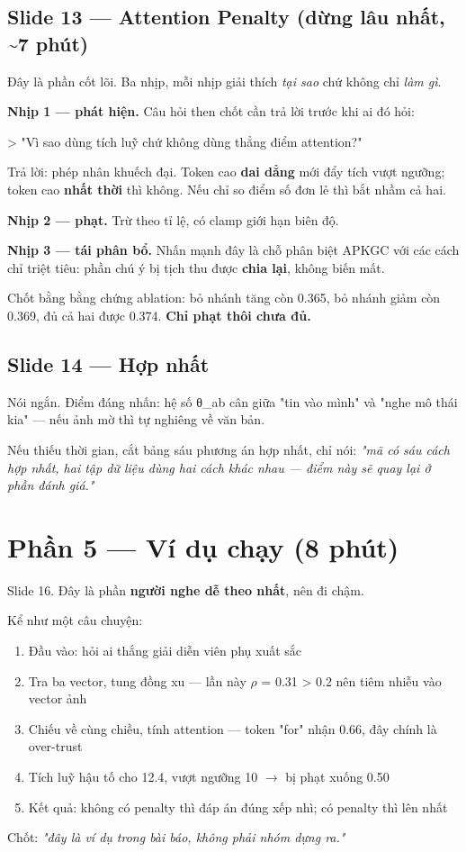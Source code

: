 \documentclass[11pt,a4paper]{article}
\newcommand{\code}[1]{{\ttfamily\small\color{codetext}#1}}
\begin{document}
\subsection{Slide 13 --- Attention Penalty (dừng lâu nhất, \textasciitilde{}7 phút)}
Đây là phần cốt lõi. Ba nhịp, mỗi nhịp giải thích \emph{tại sao} chứ không chỉ \emph{làm gì}.

\textbf{Nhịp 1 --- phát hiện.} Câu hỏi then chốt cần trả lời trước khi ai đó hỏi:

> "Vì sao dùng tích luỹ chứ không dùng thẳng điểm attention?"

Trả lời: phép nhân khuếch đại. Token cao \textbf{dai dẳng} mới đẩy tích vượt ngưỡng; token cao \textbf{nhất thời} thì không. Nếu chỉ so điểm số đơn lẻ thì bắt nhầm cả hai.

\textbf{Nhịp 2 --- phạt.} Trừ theo tỉ lệ, có \code{clamp} giới hạn biên độ.

\textbf{Nhịp 3 --- tái phân bổ.} Nhấn mạnh đây là chỗ phân biệt APKGC với các cách chỉ triệt tiêu: phần chú ý bị tịch thu được \textbf{chia lại}, không biến mất.

Chốt bằng bằng chứng ablation: bỏ nhánh tăng còn 0.365, bỏ nhánh giảm còn 0.369, đủ cả hai được 0.374. \textbf{Chỉ phạt thôi chưa đủ.}

\subsection{Slide 14 --- Hợp nhất}
Nói ngắn. Điểm đáng nhấn: hệ số \code{θ\_ab} cân giữa "tin vào mình" và "nghe mô thái kia" --- nếu ảnh mờ thì tự nghiêng về văn bản.

Nếu thiếu thời gian, cắt bảng sáu phương án hợp nhất, chỉ nói: \emph{"mã có sáu cách hợp nhất, hai tập dữ liệu dùng hai cách khác nhau --- điểm này sẽ quay lại ở phần đánh giá."}

\section{Phần 5 --- Ví dụ chạy (8 phút)}
Slide 16. Đây là phần \textbf{người nghe dễ theo nhất}, nên đi chậm.

Kể như một câu chuyện:

\begin{enumerate}\itemsep2pt
\item Đầu vào: hỏi ai thắng giải diễn viên phụ xuất sắc
\item Tra ba vector, tung đồng xu --- lần này $\rho$ = 0.31 > 0.2 nên tiêm nhiễu vào vector ảnh
\item Chiếu về cùng chiều, tính attention --- token "for" nhận 0.66, đây chính là over-trust
\item Tích luỹ hậu tố cho 12.4, vượt ngưỡng 10 $\rightarrow$ bị phạt xuống 0.50
\item Kết quả: không có penalty thì đáp án đúng xếp nhì; có penalty thì lên nhất
\end{enumerate}
Chốt: \emph{"đây là ví dụ trong bài báo, không phải nhóm dựng ra."}
\end{document}
